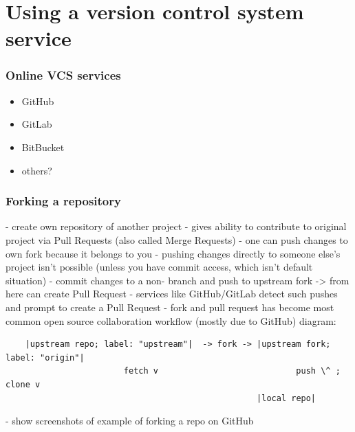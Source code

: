\section{Using a version control system service}

\begin{frame}
    \frametitle{Online VCS services}
    \begin{itemize}
        \item GitHub
        \item GitLab
        \item BitBucket
        \item others?
    \end{itemize}
\end{frame}

\begin{frame}[fragile]
    \frametitle{Forking a repository}

    - create own repository of another project
    - gives ability to contribute to original project via Pull Requests
    (also called Merge Requests)
    - one can push changes to own fork because it belongs to you
    - pushing changes directly to someone else's project isn't possible
    (unless you have commit access, which isn't default situation)
    - commit changes to a non- branch and push to upstream fork ->
    from here can create Pull Request
    - services like GitHub/GitLab detect such pushes and prompt to create a
    Pull Request
    - fork and pull request has become most common open source collaboration
    workflow (mostly due to GitHub)
    diagram:
    \begin{verbatim}
    |upstream repo; label: "upstream"|  -> fork -> |upstream fork; label: "origin"|
                        fetch v                            push \^ ; clone v
                                                   |local repo|
    \end{verbatim}

    - show screenshots of example of forking a repo on GitHub
\end{frame}

